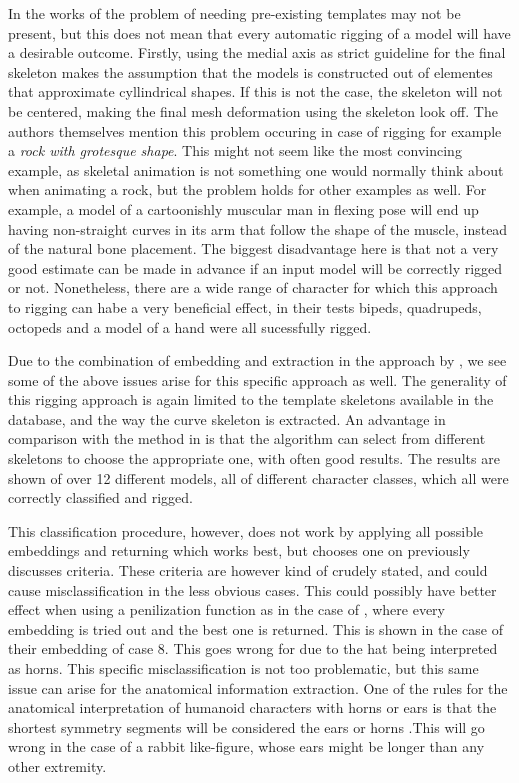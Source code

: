 \documentclass{article}
\begin{document}
In the works of \citep{paper2} the problem of needing pre-existing templates may
not be present, but this does not mean that every automatic rigging of a model will have a
desirable outcome. Firstly, using the medial axis as strict guideline for the
final skeleton makes the assumption that the models is constructed out of
elementes that approximate cyllindrical shapes. If this is not the case, the skeleton will not be centered,
making the final mesh deformation using the skeleton look off. The
authors themselves mention this problem occuring in case of rigging for example a \emph{rock
with grotesque shape}. This might not seem like the most convincing example, as
skeletal animation is not something one would normally think about when
animating a rock, but the problem holds for other examples as well. For example,
a model of a cartoonishly muscular man in flexing pose will end up having
non-straight curves in its arm that follow the shape of the muscle, instead of
the natural bone placement. The biggest disadvantage here is that not a very
good estimate can be made in advance if an input model will be correctly rigged
or not.
Nonetheless, there are a wide range of character for which this approach to
rigging can habe a very beneficial effect, in their tests bipeds, quadrupeds,
octopeds and a model of a hand were all sucessfully rigged.

Due to the combination of embedding and extraction in the approach by \citep{paper3},
we see some of the above issues arise for this specific approach as well.
The generality of this rigging approach is again limited to the template
skeletons available in the database, and the way the curve skeleton is
extracted.
An advantage in comparison with the method in \citep{paper1} is that the
algorithm can select from different skeletons to choose the appropriate one,
with often good results. The results are shown of over 12 different models, all
of different character classes, which
all were correctly classified and rigged. 

This classification procedure, however, does not work by applying 
all possible embeddings and returning which works
best, but chooses one on previously discusses criteria. These criteria are
however kind of crudely stated, and could cause misclassification in the less
obvious cases. This could possibly have better effect when using a penilization
function as in the case of \citep{paper1}, where every embedding is tried out
and the best one is returned. This is shown in the case of their embedding of
case 8. This goes wrong for \citep{paper} due to the hat being interpreted as
horns. This specific misclassification is not too problematic,
but this same issue can arise for the anatomical information
extraction. One of the rules for the anatomical interpretation of humanoid
characters with horns or ears is that the shortest symmetry segments will be
considered the ears or horns .This will go wrong in the case of a
rabbit like-figure, whose ears might be longer than any other extremity.
\end{document}

